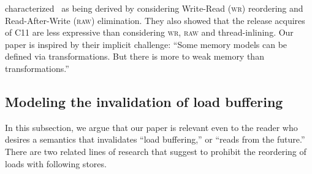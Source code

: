 \citet{DBLP:conf/fm/LahavV16} characterized \tso\ as being derived by
considering Write-Read (\textsc{wr}) reordering and Read-After-Write (\textsc{raw})
elimination.  They also showed that the release acquires of C11 are less
expressive than considering \textsc{wr}, \textsc{raw} and thread-inlining.  Our paper is
inspired by their implicit challenge: ``Some memory models can be defined via
transformations.  But there is more to weak memory than transformations.''

\subsection{Modeling the invalidation of load buffering} 

In this subsection, we argue that our paper is relevant even to the reader
who desires a semantics that invalidates ``load buffering,'' or ``reads from the future.''
There are two related lines of research that suggest to prohibit the
reordering of loads with following stores.
